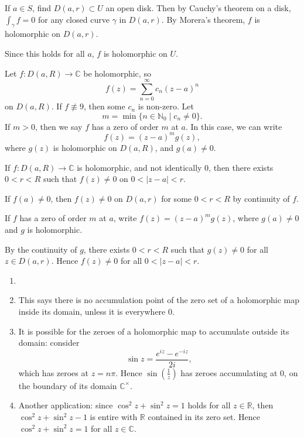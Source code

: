 \documentclass[12pt]{article}
\begin{document}
\begin{proofbox}
	If $a \in S$, find $D(a, r) \subset U$ an open disk. Then by Cauchy's theorem on a disk, $\int_{\gamma} f = 0$ for any closed curve $\gamma$ in $D(a, r)$. By Morera's theorem, $f$ is holomorphic on $D(a, r)$.

	Since this holds for all $a$, $f$ is holomorphic on $U$.
\end{proofbox}

Let $f : D(a, R) \to \mathbb{C}$ be holomorphic, so
\[
f(z) = \sum_{n = 0}^{\infty} c_n(z - a)^{n}
\]
on $D(a, R)$. If $f \not \equiv 9$, then some $c_n$ is non-zero. Let
\[
	m = \min\{n \in \mathbb{N}_{0} \mid c_n \neq 0\}
.\]
If $m > 0$, then we say $f$ has a zero of order $m$ at $a$. In this case, we can write
\[
f(z) = (z - a)^{m} g(z)
,\]
where $g(z)$ is holomorphic on $D(a, R)$, and $g(a) \neq 0$.

\begin{theorem}
	If $f : D(a, R) \to \mathbb{C}$ is holomorphic, and not identically 0, then there exists $0 < r < R$ such that $f(z) \neq 0$ on $0 < |z - a| < r$.
\end{theorem}

\begin{proofbox}
	If $f(a) \neq 0$, then $f(z) \neq 0$ on $D(a, r)$ for some $0 < r < R$ by continuity of $f$.

	If $f$ has a zero of order $m$ at $a$, write $f(z) = (z - a)^{m} g(z)$, where $g(a) \neq 0$ and $g$ is holomorphic.

	By the continuity of $g$, there exists $0 < r < R$ such that $g(z) \neq 0$ for all $z \in D(a, r)$. Hence $f(z) \neq 0$ for all $0 < |z - a| < r$.
\end{proofbox}

\begin{remark}
	\begin{enumerate}
		\item[]
		\item This says there is no accumulation point of the zero set of a holomorphic map inside its domain, unless it is everywhere $0$.
		\item It is possible for the zeroes of a holomorphic map to accumulate outside its domain: consider
			\[
			\sin z = \frac{e^{iz} - e^{-iz}}{2i}
			,\]
			which has zeroes at $z = n \pi$. Hence $\sin (\frac{1}{z})$ has zeroes accumulating at $0$, on the boundary of its domain $\mathbb{C}^{\times}$.
		\item Another application: since $\cos^2 z + \sin^2 z = 1$ holds for all $z \in \mathbb{R}$, then $\cos^2z + \sin^2 z - 1$ is entire with $\mathbb{R}$ contained in its zero set. Hence $\cos^2 z + \sin^2z = 1$ for all $z \in \mathbb{C}$.
	\end{enumerate}
\end{remark}
\end{document}
